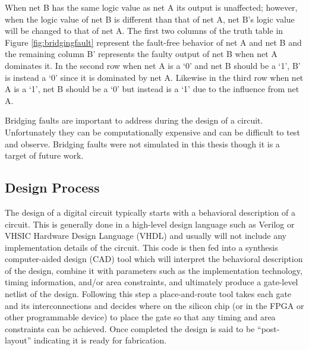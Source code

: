 \documentclass[12pt]{report}
\begin{document}
When net B has the same logic value as net A its output is unaffected; however, when the logic value of net B is different than that of net A, net B's logic value will be changed to that of net A.  The first two columns of the truth table in Figure \ref{fig:bridgingfault} represent the fault-free behavior of net A and net B and the remaining column B' represents the faulty output of net B when net A dominates it.  In the second row when net A is a `0' and net B should be a `1', B' is instead a `0' since it is dominated by net A.  Likewise in the third row when net A is a `1', net B should be a `0' but instead is a `1' due to the influence from net A.

Bridging faults are important to address during the design of a circuit.  Unfortunately they can be computationally expensive and can be difficult to test and observe\cite{stroud-bridging}.  Bridging faults were not simulated in this thesis though it is a target of future work.

\subsection{Design Process}
\label{sct:designprocess}
The design of a digital circuit typically starts with a behavioral description of a circuit.  This is generally done in a high-level design language such as Verilog or VHSIC Hardware Design Language (VHDL) and usually will not include any implementation details of the circuit\cite{advancedverilog}.  This code is then fed into a synthesis computer-aided design (CAD) tool which will interpret the behavioral description of the design, combine it with parameters such as the implementation technology, timing information, and/or area constraints, and ultimately produce a gate-level netlist of the design\cite{advancedverilog}.  Following this step a place-and-route tool takes each gate and its interconnections and decides where on the silicon chip (or in the FPGA or other programmable device) to place the gate so that any timing and area constraints can be achieved.  Once completed the design is said to be ``post-layout'' indicating it is ready for fabrication\cite{advancedverilog}.
\end{document}
